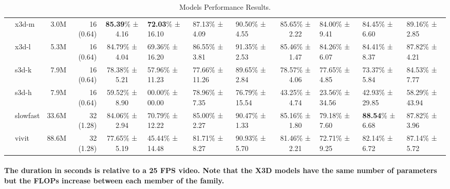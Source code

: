 \begin{table*}[t]
{\begin{tabular}{c|lrr||c|lll||c|lll}
            & x3d-m & 3.0M & 16 (0.64) & \textbf{85.39}\% ± 4.16 & \textbf{72.03}\% ± 16.10 & 87.13\% ± 4.09 & 90.50\% ± 4.55 & 85.65\% ± 2.22 & 84.00\% ± 9.41 & 84.45\% ± 6.60 & 89.16\% ± 2.85 \\
            & x3d-l & 5.3M & 16 (0.64) & 84.79\% ± 4.04 & 69.36\% ± 16.20 & 86.55\% ± 3.81 & 91.35\% ± 2.53 & 85.46\% ± 1.47 & 84.26\% ± 6.07 & 84.41\% ± 8.37 & 87.82\% ± 4.21 \\
            & s3d-k & 7.9M & 16 (0.64) & 78.38\% ± 5.21 & 57.96\% ± 11.23 & 77.66\% ± 11.26 & 89.65\% ± 2.84 & 78.57\% ± 4.06 & 77.65\% ± 4.85 & 73.37\% ± 5.84 & 84.53\% ± 7.77 \\
            & s3d-h & 7.9M & 16 (0.64) & 59.52\% ± 8.90 & 00.00\% ± 00.00 & 78.96\% ± 7.35 & 76.79\% ± 15.54 & 43.25\% ± 4.74 & 23.56\% ± 34.56 & 42.93\% ± 29.85 & 58.29\% ± 43.94 \\
            & slowfast & 33.6M & 32 (1.28) & 84.06\% ± 2.94 & 70.79\% ± 12.22 & 85.00\% ± 2.27 & 90.47\% ± 1.33 & 85.16\% ± 1.80 & 79.18\% ± 7.60 & \textbf{88.54}\% ± 6.68 & 87.82\% ± 3.96 \\
            & vivit & 88.6M & 32 (1.28) & 77.65\% ± 5.19 & 45.44\% ± 14.48 & 81.71\% ± 8.27 & 90.93\% ± 5.70 & 81.46\% ± 2.21 & 72.71\% ± 9.25 & 82.14\% ± 6.72 & 87.14\% ± 5.72 \\
            \bottomrule
        \end{tabular}
    }
    \vspace{-2ex}
    \centering
    \caption{Models Performance Results.}
    \paragraph{
        The duration in seconds is relative to a 25 FPS video. Note that the X3D  models have the same number of parameters but the FLOPs increase between each member of the family.
    }
    \label{table:training-results}
\end{table*}